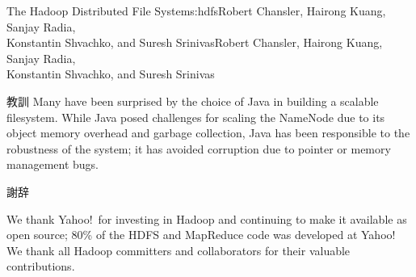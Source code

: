 \begin{aosachaptertoc}{The Hadoop Distributed File System}{s:hdfs}{Robert Chansler, Hairong Kuang, Sanjay Radia, \\ Konstantin Shvachko, and Suresh Srinivas}{Robert Chansler, Hairong Kuang, Sanjay Radia, \\ \hspace*{0.9cm} Konstantin Shvachko, and Suresh Srinivas}
\begin{aosasect1}{教訓}
Many have been surprised by the choice of Java in building a scalable
filesystem. While Java posed challenges for scaling the NameNode due
to its object memory overhead and garbage collection, Java has been
responsible to the robustness of the system; it has avoided
corruption due to pointer or memory management bugs.

\end{aosasect1}

\begin{aosasect1}{謝辞}

We thank Yahoo!\ for investing in Hadoop and continuing to
make it available as open source; 80\% of the HDFS and MapReduce code
was developed at Yahoo! We thank all Hadoop committers and
collaborators for their valuable contributions.

\end{aosasect1}

\end{aosachaptertoc}

